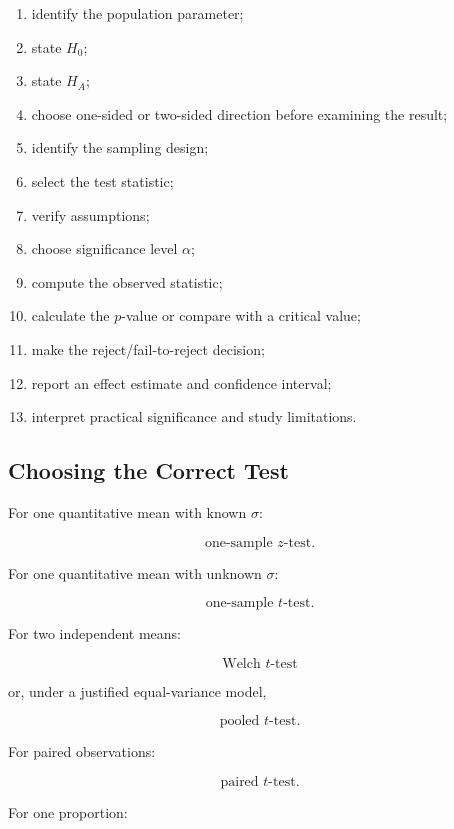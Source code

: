 \begin{enumerate}
    \item identify the population parameter;
    \item state \(H_0\);
    \item state \(H_A\);
    \item choose one-sided or two-sided direction before examining the
          result;
    \item identify the sampling design;
    \item select the test statistic;
    \item verify assumptions;
    \item choose significance level \(\alpha\);
    \item compute the observed statistic;
    \item calculate the \(p\)-value or compare with a critical value;
    \item make the reject/fail-to-reject decision;
    \item report an effect estimate and confidence interval;
    \item interpret practical significance and study limitations.
\end{enumerate}

\subsection{Choosing the Correct Test}
\label{subsec:choosing-correct-test}

For one quantitative mean with known \(\sigma\):

\[
\boxed{
\text{one-sample }z\text{-test}.
}
\]

For one quantitative mean with unknown \(\sigma\):

\[
\boxed{
\text{one-sample }t\text{-test}.
}
\]

For two independent means:

\[
\boxed{
\text{Welch }t\text{-test}
}
\]

or, under a justified equal-variance model,

\[
\boxed{
\text{pooled }t\text{-test}.
}
\]

For paired observations:

\[
\boxed{
\text{paired }t\text{-test}.
}
\]

For one proportion:

